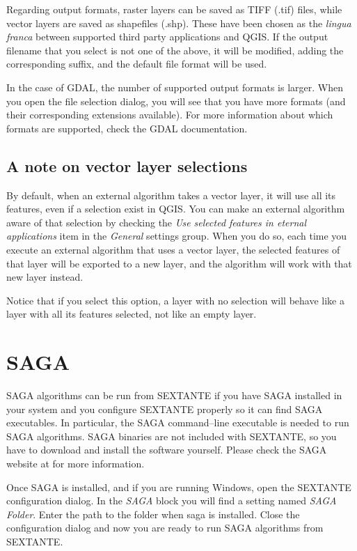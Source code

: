 Regarding output formats, raster layers can be saved as TIFF (.tif) files, while vector layers are saved as shapefiles (.shp). These have been chosen as the \emph{lingua franca} between supported third party applications and QGIS. If the output filename that you select is not one of the above, it will be modified, adding the corresponding suffix, and the default file format will be used.

In the case of GDAL, the number of supported output formats is larger. When you open the file selection dialog, you will see that you have more formats (and their corresponding extensions available). For more information about which formats are supported, check the GDAL documentation.

\subsection{A note on vector layer selections}

By default, when an external algorithm takes a vector layer, it will use all its features, even if a selection exist in QGIS. You can make an external algorithm aware of that selection by checking the \emph{Use selected features in eternal applications} item in the \emph{General} settings group. When you do so, each time you execute an external algorithm that uses a vector layer, the selected features of that layer will be exported to a new layer, and the algorithm will work with that new layer instead.

Notice that if you select this option, a layer with no selection will behave like a layer with all its features selected, not like an empty layer.


\section{SAGA}

SAGA algorithms can be run from SEXTANTE if you have SAGA installed in your system and you configure SEXTANTE properly so it can find SAGA executables. In particular, the SAGA command--line executable is needed to run SAGA algorithms. SAGA binaries are not included with SEXTANTE, so you have to download and install the software yourself. Please check the SAGA website at \texttt{} for more information.

Once SAGA is installed, and if you are running Windows, open the SEXTANTE configuration dialog. In the \emph{SAGA} block you will find a setting named \emph{SAGA Folder}. Enter the path to the folder when saga is installed. Close the configuration dialog and now you are ready to run SAGA algorithms from SEXTANTE.

